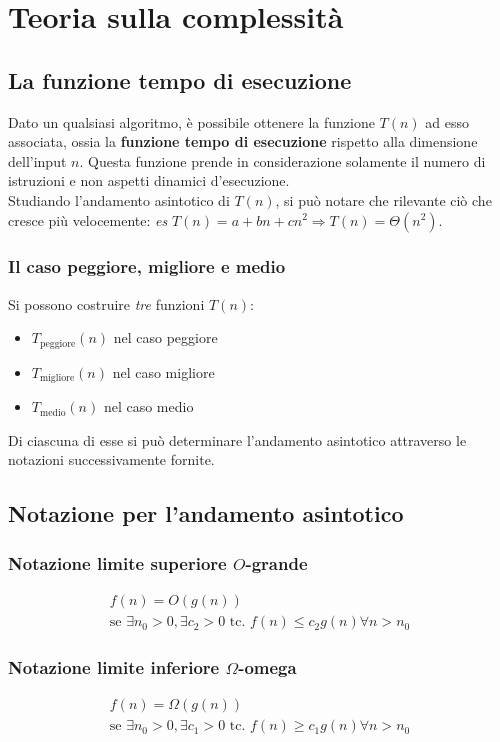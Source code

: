 \chapter{Teoria sulla complessità}
\section{La funzione tempo di esecuzione}
Dato un qualsiasi algoritmo, è possibile ottenere la funzione $T(n)$ ad esso associata, ossia la \textbf{funzione tempo di esecuzione} rispetto alla dimensione dell'input $n$. Questa funzione prende in considerazione solamente il numero di istruzioni e non aspetti dinamici d'esecuzione.\\
Studiando l'andamento asintotico di $T(n)$, si può notare che rilevante ciò che cresce più velocemente:
\textit{es} $T(n)=a+bn+cn^2 \Rightarrow T(n) = \varTheta(n^2)$.
\subsection*{Il caso peggiore, migliore e medio}
Si possono costruire \textit{tre} funzioni $T(n)$:
\begin{itemize}[noitemsep, nolistsep]
	\item $T_\text{peggiore}(n)$ nel caso peggiore
	\item $T_\text{migliore}(n)$ nel caso migliore
	\item $T_\text{medio}(n)$ nel caso medio
\end{itemize}
\vspace{10px}
Di ciascuna di esse si può determinare l'andamento asintotico attraverso le notazioni successivamente fornite.

\section{Notazione per l'andamento asintotico}
\subsection*{Notazione limite superiore $O$-grande}
\begin{gather*}
f(n)=O(g(n))\\
\text{se } \exists n_0 >0, \exists c_2 >0 \text{ tc. } f(n)\leq c_2 g(n) \forall n>n_0
\end{gather*}

\subsection*{Notazione limite inferiore $\varOmega$-omega}
\begin{gather*}
f(n)=\varOmega(g(n))\\
\text{se } \exists n_0 >0, \exists c_1 >0 \text{ tc. } f(n)\geq c_1 g(n) \forall n>n_0
\end{gather*}

